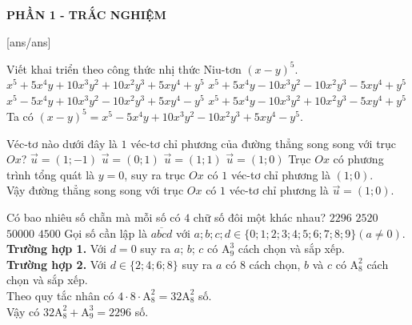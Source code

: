 
\begin{center}
	\textbf{PHẦN 1 - TRẮC NGHIỆM}
\end{center}
[ans/ans]

\begin{ex}%
Viết khai triển theo công thức nhị thức Niu-tơn $\left(x-y\right)^5$.
\choice
{$x^5+5x^4 y+10x^3 y^2+10x^2 y^3+5xy^4+y^5$}
{$x^5+5x^4 y-10x^3 y^2-10x^2 y^3-5xy^4+y^5$}
{\True $x^5-5x^4 y+10x^3 y^2-10x^2 y^3+5xy^4-y^5$}
{$x^5+5x^4 y-10x^3 y^2+10x^2 y^3-5xy^4+y^5$}
\loigiai
{
Ta có $\left(x-y\right)^5=x^5-5x^4 y+10x^3 y^2-10x^2 y^3+5xy^4-y^5$.
}
\end{ex}

\begin{ex}%
Véc-tơ nào dưới đây là $1$ véc-tơ chỉ phương của đường thẳng song song với trục $Ox$?
\choice
{$\overrightarrow{u}=(1;-1)$}
{$\overrightarrow{u}=(0;1)$}
{$\overrightarrow{u}=(1;1)$}
{\True $\overrightarrow{u}=(1;0)$}
\loigiai
{
Trục $Ox$ có phương trình tổng quát là $y=0$, suy ra trục $Ox$ có $1$ véc-tơ chỉ phương là $(1;0)$. \\
Vậy đường thẳng song song với trục $Ox$ có $1$ véc-tơ chỉ phương là $\overrightarrow{u}=(1;0)$.
}
\end{ex}

\begin{ex}%
Có bao nhiêu số chẵn mà mỗi số có $4$ chữ số đôi một khác nhau?
\choice
{\True $2296$}
{$2520$}
{$50000$}
{$4500$}
\loigiai
{
Gọi số cần lập là $\overline{abcd}$ với $a; b; c; d \in\{0; 1; 2; 3; 4; 5; 6; 7; 8; 9\}\left(a\ne0\right)$. \\
\textbf{Trường hợp 1.} Với $d=0$ suy ra $a$; $b$; $c$ có $\mathrm{A}_{9}^{3}$ cách chọn và sắp xếp. \\
\textbf{Trường hợp 2.} Với $d\in\{2;4;6;8\}$ suy ra $a$ có $8$ cách chọn, $b$ và $c$ có $\mathrm{A}_{8}^{2}$ cách chọn và sắp xếp. \\
Theo quy tắc nhân có $4\cdot8\cdot\mathrm{A}_{8}^{2} = 32\mathrm{A}_{8}^{2}$ số. \\
Vậy có $32\mathrm{A}_{8}^{2}+\mathrm{A}_{9}^{3}=2296$ số.
}
\end{ex}

